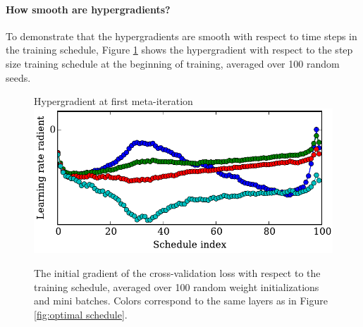 \documentclass{article}
\begin{document}
\paragraph{How smooth are hypergradients?}
To demonstrate that the hypergradients are smooth with respect to time steps in the training schedule, Figure \ref{fig:smoothed gradient} shows the hypergradient with respect to the step size training schedule at the beginning of training, averaged over 100 random seeds.
%
\begin{figure}[t]
\vskip 0.1in
\begin{center}
Hypergradient at first meta-iteration\\
\includegraphics[width=\columnwidth]{../experiments/Feb_3_training_schedules/5_initial_gradient/schedules_small.pdf}
\vskip -0.1in
\caption{The initial gradient of the cross-validation loss with respect to the training schedule, averaged over 100 random weight initializations and mini batches.
Colors correspond to the same layers as in Figure \ref{fig:optimal schedule}.}
\label{fig:smoothed gradient}
\end{center}
\vskip -0.2in
\end{figure} 
%
\end{document}
